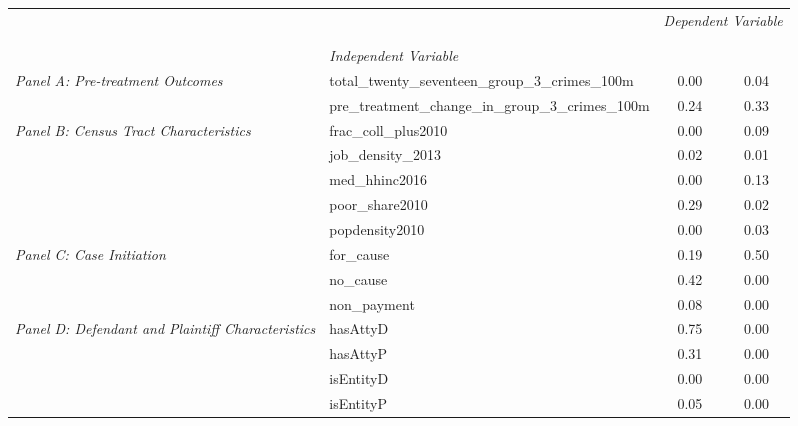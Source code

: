 \begin{tabular}{llcc}
\toprule
 &  & \multicolumn{2}{c}{\textit{Dependent Variable}} \\
\cline{3-4}
\\
 &  &  &  \\
 & \emph{Independent Variable} &  &  \\
\midrule
\multirow[c]{2}{3cm}{\textit{Panel A: Pre-treatment Outcomes}} & total_twenty_seventeen_group_3_crimes_100m & 0.00 & 0.04 \\
 & pre_treatment_change_in_group_3_crimes_100m & 0.24 & 0.33 \\
\cline{1-4}
\multirow[c]{5}{3cm}{\textit{Panel B: Census Tract Characteristics}} & frac_coll_plus2010 & 0.00 & 0.09 \\
 & job_density_2013 & 0.02 & 0.01 \\
 & med_hhinc2016 & 0.00 & 0.13 \\
 & poor_share2010 & 0.29 & 0.02 \\
 & popdensity2010 & 0.00 & 0.03 \\
\cline{1-4}
\multirow[c]{3}{3cm}{\textit{Panel C: Case Initiation}} & for_cause & 0.19 & 0.50 \\
 & no_cause & 0.42 & 0.00 \\
 & non_payment & 0.08 & 0.00 \\
\cline{1-4}
\multirow[c]{4}{3cm}{\textit{Panel D: Defendant and Plaintiff Characteristics}} & hasAttyD & 0.75 & 0.00 \\
 & hasAttyP & 0.31 & 0.00 \\
 & isEntityD & 0.00 & 0.00 \\
 & isEntityP & 0.05 & 0.00 \\
\cline{1-4}
\bottomrule
\end{tabular}
